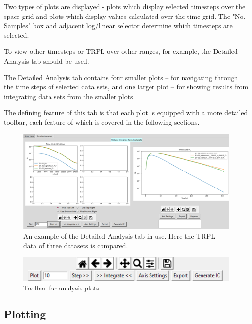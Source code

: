 \documentclass[11pt,letterpaper,titlepage]{article}
\begin{document}
		\par Two types of plots are displayed - plots which display selected timesteps over the space grid and plots which display values calculated over the time grid. The "No. Samples" box and adjacent log/linear selector determine which timesteps are selected.
		
		\par To view other timesteps or TRPL over other ranges, for example, the Detailed Analysis tab should be used.
		
		\par The Detailed Analysis tab contains four smaller plots – for navigating through the time steps of selected data sets, and one larger plot – for showing results from integrating data sets from the smaller plots.
		
		\par The defining feature of this tab is that each plot is equipped with a more detailed toolbar, each feature of which is covered in the following sections.
		
		\begin{figure}[H]
			\label{fig:detailed_example}
			\centering
			\includegraphics[scale=1]{"detailed_example"}
			\caption{An example of the Detailed Analysis tab in use. Here the TRPL data of three datasets is compared.}
		\end{figure}
		
		\begin{figure}[H]
			\label{fig:detailed_toolbar}
			\centering
			\includegraphics[scale=1]{"detailed_toolbar"}
			\caption {Toolbar for analysis plots.}
		\end{figure}
	
		\subsection{Plotting}
		
\end{document}
